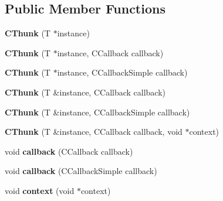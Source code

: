 \subsection*{Public Member Functions}
\begin{DoxyCompactItemize}
\item 
{\bfseries C\+Thunk} (T $\ast$instance)\hypertarget{classCThunk_a11e49294221b88fa82e2f8840b5d019b}{}\label{classCThunk_a11e49294221b88fa82e2f8840b5d019b}

\item 
{\bfseries C\+Thunk} (T $\ast$instance, C\+Callback callback)\hypertarget{classCThunk_adf513f25c9eafd626398e57611fb34d6}{}\label{classCThunk_adf513f25c9eafd626398e57611fb34d6}

\item 
{\bfseries C\+Thunk} (T $\ast$instance, C\+Callback\+Simple callback)\hypertarget{classCThunk_a6c290556bbae0a5726222f913940f19c}{}\label{classCThunk_a6c290556bbae0a5726222f913940f19c}

\item 
{\bfseries C\+Thunk} (T \&instance, C\+Callback callback)\hypertarget{classCThunk_a03e474f9cd7219f235e5c882f0df58c2}{}\label{classCThunk_a03e474f9cd7219f235e5c882f0df58c2}

\item 
{\bfseries C\+Thunk} (T \&instance, C\+Callback\+Simple callback)\hypertarget{classCThunk_abfeb17643d1d724eec8c1b2817e5287b}{}\label{classCThunk_abfeb17643d1d724eec8c1b2817e5287b}

\item 
{\bfseries C\+Thunk} (T \&instance, C\+Callback callback, void $\ast$context)\hypertarget{classCThunk_afa1896696ea945eb44f1a02c59e86923}{}\label{classCThunk_afa1896696ea945eb44f1a02c59e86923}

\item 
void {\bfseries callback} (C\+Callback callback)\hypertarget{classCThunk_a93023dcf8b5fa1b3f1582e74bc4606b6}{}\label{classCThunk_a93023dcf8b5fa1b3f1582e74bc4606b6}

\item 
void {\bfseries callback} (C\+Callback\+Simple callback)\hypertarget{classCThunk_a927b5c8d0570869d6a393add31b9306f}{}\label{classCThunk_a927b5c8d0570869d6a393add31b9306f}

\item 
void {\bfseries context} (void $\ast$context)\hypertarget{classCThunk_a8ba49cf7e851365b40eb086cee4be3ac}{}\label{classCThunk_a8ba49cf7e851365b40eb086cee4be3ac}


\end{DoxyCompactItemize}

